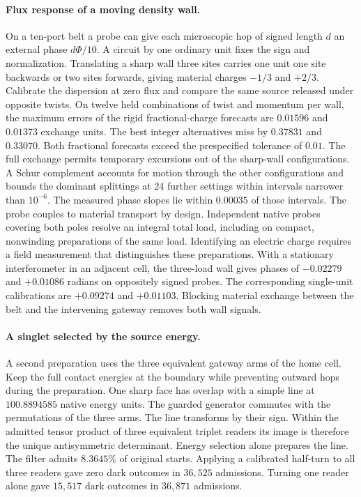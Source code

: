 \documentclass[11pt]{article}
\theoremstyle{definition}
\theoremstyle{remark}
\theoremstyle{plain}
\begin{document}
\paragraph{Flux response of a moving density wall.}
On a ten-port belt a probe can give each microscopic hop of signed
length $d$ an external phase $d\Phi/10$. A circuit by one ordinary
unit fixes the sign and normalization. Translating a sharp wall three
sites carries one unit one site backwards or two sites forwards, giving
material charges $-1/3$ and $+2/3$. Calibrate the dispersion at zero
flux and compare the same source released under opposite twists.
On twelve held combinations of twist and momentum per wall, the maximum
errors of the rigid fractional-charge forecasts are $0.01596$ and
$0.01373$ exchange units. The best integer alternatives miss by
$0.37831$ and $0.33070$. Both fractional forecasts exceed the
prespecified tolerance of $0.01$. The full exchange permits temporary
excursions out of the sharp-wall configurations. A Schur complement accounts for motion through the other
configurations and bounds the dominant
splittings at 24 further settings within intervals narrower than $10^{-6}$.
The measured phase slopes lie within $0.00035$ of those intervals.
The probe couples to material transport by design. Independent native
probes covering both poles resolve an integral total load, including
on compact, nonwinding preparations of the same load. Identifying an
electric charge requires a field measurement that distinguishes these
preparations. With a stationary interferometer in an adjacent cell,
the three-load wall gives phases of $-0.02279$ and $+0.01086$ radians
on oppositely signed probes. The corresponding single-unit calibrations
are $+0.09274$ and $+0.01103$. Blocking material exchange between the
belt and the intervening gateway removes both wall signals.

\paragraph{A singlet selected by the source energy.}
A second preparation uses the three equivalent gateway arms of the
home cell. Keep the full contact energies at the boundary while
preventing outward hops during the preparation. One sharp face has
overlap with a simple line at $100.8894585$ native energy units.
The guarded generator commutes with the permutations of the three
arms. The line transforms by their sign. Within the admitted tensor
product of three equivalent triplet readers its image is therefore
the unique antisymmetric determinant. Energy selection alone prepares
the line. The filter admits $8.3645\%$ of original starts.
Applying a calibrated half-turn to all three readers gave zero dark
outcomes in $36{,}525$ admissions. Turning one reader alone gave
$15{,}517$ dark outcomes in $36{,}871$ admissions.
\end{document}
